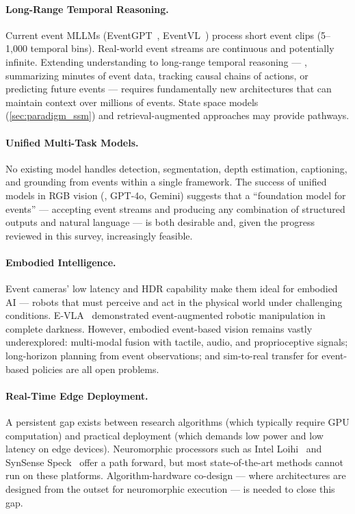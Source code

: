 \paragraph{Long-Range Temporal Reasoning.}
Current event MLLMs (EventGPT~\cite{zhou2025eventgpt}, EventVL~\cite{li2025eventvl}) process short event clips (5--1,000 temporal bins). Real-world event streams are continuous and potentially infinite. Extending understanding to long-range temporal reasoning --- \eg, summarizing minutes of event data, tracking causal chains of actions, or predicting future events --- requires fundamentally new architectures that can maintain context over millions of events. State space models (\cref{sec:paradigm_ssm}) and retrieval-augmented approaches may provide pathways.

\paragraph{Unified Multi-Task Models.}
No existing model handles detection, segmentation, depth estimation, captioning, and grounding from events within a single framework. The success of unified models in RGB vision (\eg, GPT-4o, Gemini) suggests that a ``foundation model for events'' --- accepting event streams and producing any combination of structured outputs and natural language --- is both desirable and, given the progress reviewed in this survey, increasingly feasible.

\paragraph{Embodied Intelligence.}
Event cameras' low latency and HDR capability make them ideal for embodied AI --- robots that must perceive and act in the physical world under challenging conditions. E-VLA~\cite{miao2026evla} demonstrated event-augmented robotic manipulation in complete darkness. However, embodied event-based vision remains vastly underexplored: multi-modal fusion with tactile, audio, and proprioceptive signals; long-horizon planning from event observations; and sim-to-real transfer for event-based policies are all open problems.

\paragraph{Real-Time Edge Deployment.}
A persistent gap exists between research algorithms (which typically require GPU computation) and practical deployment (which demands low power and low latency on edge devices). Neuromorphic processors such as Intel Loihi~\cite{davies2018loihi} and SynSense Speck~\cite{liu2023speck} offer a path forward, but most state-of-the-art methods cannot run on these platforms. Algorithm-hardware co-design --- where architectures are designed from the outset for neuromorphic execution --- is needed to close this gap.

